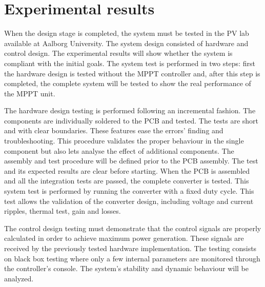 
\chapter{Experimental results} \label{ch:test_validation}

When the design stage is completed, the system must be tested in the PV lab available at Aalborg University. The system design consisted of hardware and control design. The experimental results will show whether the system is compliant with the initial goals. The system test is performed in two steps: first the hardware design is tested without the MPPT controller and, after this step is completed, the complete system will be tested to show the real performance of the MPPT unit.

The hardware design testing is performed following an incremental fashion. The components are individually soldered to the PCB and tested. The tests are short and with clear boundaries. These features ease the errors' finding and troubleshooting. This procedure validates the proper behaviour in the single component but also lets analyse the effect of additional components. The assembly and test procedure will be defined prior to the PCB assembly. The test and its expected results are clear before starting. When the PCB is assembled and all the integration tests are passed, the complete converter is tested. This system test is performed by running the converter with a fixed duty cycle. This test allows the validation of the converter design, including voltage and current ripples, thermal test, gain and losses.

The control design testing must demonstrate that the control signals are properly calculated in order to achieve maximum power generation. These signals are received by the previously tested hardware implementation. The testing consists on black box testing where only a few internal parameters are monitored through the controller's console. The 
system's stability and dynamic behaviour will be analyzed.



